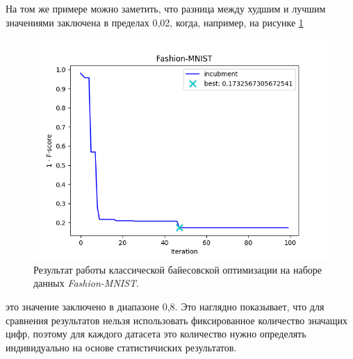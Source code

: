 \documentclass[times,specification,annotation]{itmo-student-thesis}
\begin{document}
	На том же примере можно заметить, что разница между худшим и лучшим значениями заключена в пределах 0,02, когда, например, на рисунке \ref{img:bo-fashion} 
	\begin{figure}[!ht]
		\caption{Результат работы классической байесовской оптимизации на наборе данных \textit{Fashion-MNIST}.}\label{img:bo-fashion}
		\includegraphics[width=0.85\linewidth]{../png/incubment-iteration/Fashion-MNIST}
		\centering
	\end{figure}
	это значение заключено в диапазоне 0,8. Это наглядно показывает, что для сравнения результатов нельзя использовать фиксированное количество значащих цифр, поэтому для каждого датасета это количество нужно определять индивидуально на основе статистичиских результатов. 
	
\end{document}
